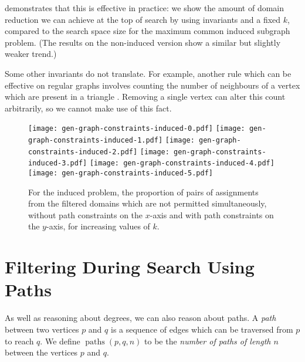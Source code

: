 \documentclass[letterpaper]{article}
\newcommand{\citep}[1]{\cite{#1}}
\theoremstyle{definition}
\newcommand{\paths}{\operatorname{paths}}
\begin{document}
 demonstrates that this is effective in practice: we show the amount of domain
reduction we can achieve at the top of search by using invariants and a fixed $k$, compared to the
search space size for the maximum common induced subgraph problem. (The results on the non-induced
version show a similar but slightly weaker trend.)

Some other invariants do not translate. For example, another rule which can be effective on regular
graphs involves counting the number of neighbours of a vertex which are present in a triangle
\citep{mckay2014practical}. Removing a single vertex can alter this count arbitrarily, so we cannot
make use of this fact.

\begin{figure*}[t]
    \centering
    \texttt{[image: gen-graph-constraints-induced-0.pdf]}
    \texttt{[image: gen-graph-constraints-induced-1.pdf]}
    \texttt{[image: gen-graph-constraints-induced-2.pdf]}
    \texttt{[image: gen-graph-constraints-induced-3.pdf]}
    \texttt{[image: gen-graph-constraints-induced-4.pdf]}
    \texttt{[image: gen-graph-constraints-induced-5.pdf]}

    \caption{For the induced problem, the proportion of pairs of assignments from the filtered
    domains which are not permitted simultaneously, without path constraints on the $x$-axis and
    with path constraints on the $y$-axis, for increasing values of $k$.}\label{figure:constraints}
\end{figure*}

\section{Filtering During Search Using Paths}\label{section:pathfiltering}

As well as reasoning about degrees, we can also reason about paths.  A \emph{path} between two
vertices $p$ and $q$ is a sequence of edges which can be traversed from $p$ to reach $q$. We define
$\paths(p,q,n)$ to be the \emph{number of paths of length $n$} between the vertices $p$ and $q$.
\end{document}
